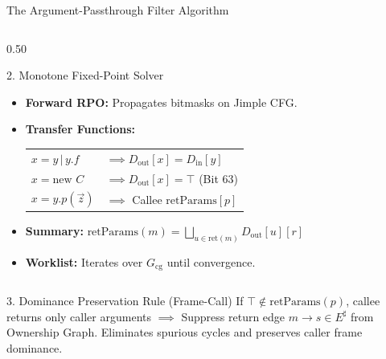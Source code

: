 \documentclass[11pt]{beamer}
\providecommand{\retParams}{\text{retParams}}
\begin{document}
\begin{frame}{The Argument-Passthrough Filter Algorithm}
\begin{columns}[T,onlytextwidth]
    \begin{column}{0.50\textwidth}
      \begin{block}{2. Monotone Fixed-Point Solver}
        \scriptsize
        \begin{itemize}\setlength{\itemsep}{0.8pt}\setlength{\topsep}{0pt}\setlength{\partopsep}{0pt}\setlength{\parskip}{0pt}\setlength{\parsep}{0pt}
          \item \textbf{Forward RPO:} Propagates bitmasks on Jimple CFG.
          \item \textbf{Transfer Functions:}
            \vspace{1pt}
            \begin{tabular}{@{}ll@{}}
              $x = y \,|\, y.f$ & $\implies D_{\text{out}}[x] = D_{\text{in}}[y]$ \\
              $x = \text{new } C$ & $\implies D_{\text{out}}[x] = \top$ (Bit 63) \\
              $x = y.p(\vec{z})$ & $\implies$ Callee $\retParams[p]$
            \end{tabular}
          \item \textbf{Summary:} $\retParams(m) = \bigsqcup_{u \in \text{ret}(m)} D_{\text{out}}[u][r]$
          \item \textbf{Worklist:} Iterates over $G_{\text{cg}}$ until convergence.
        \end{itemize}
      \end{block}
    \end{column}
  \end{columns}
  \vspace{-0.5em}
  \begin{alertblock}{3. Dominance Preservation Rule (Frame-Call)}
    \scriptsize
    If $\top \notin \retParams(p)$, callee returns only caller arguments $\implies$ Suppress return edge $m \to s \in E^\sharp$ from Ownership Graph. Eliminates spurious cycles and preserves caller frame dominance.
  \end{alertblock}
\end{frame}
\endgroup
\end{document}
